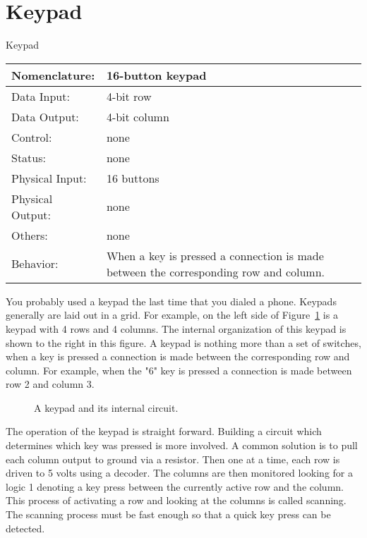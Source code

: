 \section{Keypad}
\label{page:keypad}
\begin{buildingblock}{Keypad}
\begin{tabular}{|l|p{3.5in}|} \hline
Nomenclature:  & 16-button keypad                           \\ \hline
Data Input:    & 4-bit row        \\ \hline
Data Output:   & 4-bit column   \\ \hline
Control:       & none           \\ \hline
Status:        & none                                   \\ \hline
Physical Input:& 16 buttons		\\ \hline
Physical Output:& none		\\ \hline
Others:        & none                   \\ \hline
Behavior:      & When a key is pressed a connection is made between
the corresponding row and column. \\ \hline
\end{tabular}
\end{buildingblock}

You probably used a keypad the last time that you dialed a phone.
Keypads generally are laid out in a grid.
For example, on the left side of Figure~\ref{fig:commonPeripheralComponentskeypad} 
is a keypad with 4 rows and 4 columns.  The internal organization
of this keypad is shown to the right in this figure.  A keypad is
nothing more than a set of switches, when a key is pressed a connection
is made between the corresponding row and column.  For example, when
the "6" key is pressed a connection is made between row 2 and column
3.

\begin{figure}[ht]
\caption{A keypad and its internal circuit.}
\label{fig:commonPeripheralComponentskeypad}
\end{figure}

The operation of the keypad is straight forward.  Building a circuit
which determines which key was pressed is more involved.   A common
solution is to pull each column output to ground via a resistor.  Then
one at a time, each row is driven to 5 volts using a decoder.  The
columns are then monitored looking for a logic 1 denoting a key press
between the currently active row and the column.  This process
of activating a row and looking at the columns is called scanning.  The
scanning process must be fast enough so that a quick key press can be 
detected.

